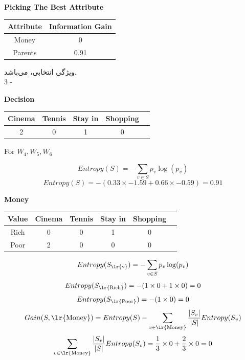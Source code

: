 \documentclass{article}
\newcommand{\tf}[1]{\text{\lr{#1}}}
\begin{document}
	\begin{latin}
		\textbf{Picking The Best Attribute}
		\begin{center}
			\begin{tabular}{|c|c|}
				\hline
				Attribute & Information Gain\\
				\hline
				\hline
				Money & 0\\
				Parents & 0.91\\
				\hline
			\end{tabular}
		\end{center}
	\end{latin}
	ویژگی انتخابی،
	می‌باشد.\\
	3 - 
	\begin{latin}
		\textbf{Decision}
		\begin{center}
			\begin{tabular}{|c|c|c|c|c|}
				\hline
				Cinema & Tennis & Stay in & Shopping\\
				\hline
				\hline
				2 & 0 & 1 & 0\\
				\hline
			\end{tabular}
		\end{center}
		For $W_4, W_5, W_{6}$
	\end{latin}
	\vspace{5pt}
	\[
	Entropy(S) = -\sum_{v \in S} p_v\log (p_v)
	\]
	\[
	Entropy(S) = -( 0.33 \times -1.59 + 0.66 \times -0.59) = 0.91
	\]
	\begin{latin}
		\textbf{Money}
		\begin{center}
			\begin{tabular}{|c|c|c|c|c|c|}
				\hline
				Value & Cinema & Tennis & Stay in & Shopping\\
				\hline
				\hline
				Rich & 0 & 0 & 1 &0\\
				\hline
				Poor & 2 & 0 & 0 & 0\\
				\hline
			\end{tabular}
		\end{center}
	\end{latin}
	\vspace{5pt}
	\[
	Entropy(S_{\text{\lr{v}}}) = -\sum_{v \in S} p_v\log (p_v)
	\]
	\[
	Entropy(S_{\tf{Rich}}) = -( 1 \times 0 + 1 \times 0) = 0
	\]
	\[
	Entropy(S_{\tf{Poor}}) = -( 1 \times 0 ) = 0
	\]
	\vspace{10pt}
	\[
	Gain(S, \tf{Money}) = Entropy(S) - \sum_{v \in \tf{Money}} \frac{| S_v |}{| S |}Entropy(S_v)
	\] 
	\[
	\sum_{v \in \tf{Money}} \frac{| S_v |}{| S |}Entropy(S_v) = \frac{1}{3} \times 0 + \frac{2}{3} \times 0 = 0
	\]
\end{document}
